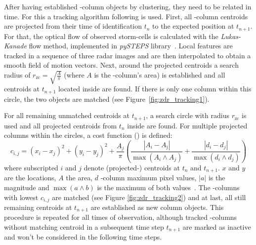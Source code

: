 After having established \zdr-column objects by clustering, they need to be related in time. For this a tracking algorithm following \textcite{zdr-tracking} is used. First, all \zdr-column centroids are projected from their time of identification $t_n$ to the expected position at $t_{n+1}$. For that, the optical flow of observed storm-cells is calculated with the \emph{Lukas-Kanade} flow method, implemented in \emph{pySTEPS} library~\cite{pysteps}.  Local features are tracked in a sequence of three radar images and are then interpolated to obtain a smooth field of motion vectors.
Next, around the projected centroids a search radius of $r_\text{zc} = \sqrt{\frac{A}{\pi}}$ (where $A$ is the \zdr-column's area) is established and all centroids at $t_{n+1}$ located inside are found. If there is only one column within this circle, the two objects are matched (see Figure~\ref{fig:zdr_tracking1}). 

For all remaining unmatched centroids at $t_{n+1}$, a search circle with radius $r_\text{zc}$ is used and all projected centroids from $t_n$ inside are found. For multiple projected columns within the circles, a cost function (\cite[eq.~(7)]{zdr-tracking}) is defined:
\begin{equation}
\label{eq:cost}
c_{i, j} = (x_{i} - x_{j})^2 +(y_{i} - y_{j})^2 + \dfrac{A_{j}}{\pi} \left( \dfrac{|A_{i} - A_\text{j}|}{\max(A_{i} \land A_{j})} + \dfrac{|d_{i} - d_{j}|}{\max(d_{i} \land d_{j})} \right)
\end{equation}
where subscripted $i$ and $j$ denote (projected-) centroids at $t_n$ and $t_{n+1}$. $x$ and $y$ are the locations, $A$ the area, $d$ \zdr-column maximum pixel values, $|a|$ is the magnitude and $\max(a \land b)$ is the maximum of both values~\cite[p.~26]{zdr-tracking}. The \zdr-columns with lowest $c_{i, j}$ are matched (see Figure \ref{fig:zdr_tracking2}) and at last, all still remaining centroids at $t_{n+1}$ are established as new column objects.
This procedure is repeated for all times of observation, although tracked \zdr-columns without matching centroid in a subsequent time step $t_{n+1}$ are marked as inactive and won't be considered in the following time steps.

